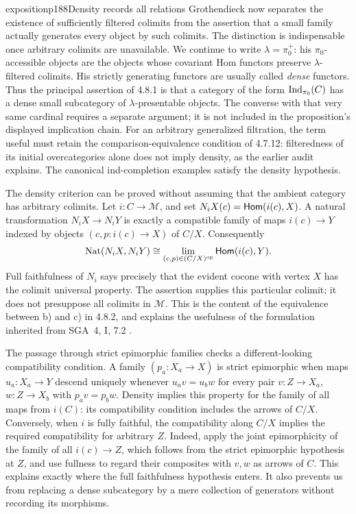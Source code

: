 
\begin{dcomment}{exposition}{p188}{Density records all relations}
Grothendieck now separates the existence of sufficiently filtered colimits from the assertion that a small family actually generates every object by such colimits. The distinction is indispensable once arbitrary colimits are unavailable. We continue to write $\lambda=\pi_0^+$: his $\pi_0$-accessible objects are the objects whose covariant Hom functors preserve $\lambda$-filtered colimits. His strictly generating functors are usually called \emph{dense} functors. Thus the principal assertion of 4.8.1 is that a category of the form $\operatorname{Ind}_{\pi_0}(C)$ has a dense small subcategory of $\lambda$-presentable objects. The converse with that very same cardinal requires a separate argument; it is not included in the proposition's displayed implication chain. For an arbitrary generalized filtration, the term useful must retain the comparison-equivalence condition of 4.7.12: filteredness of its initial overcategories alone does not imply density, as the earlier audit explains. The canonical ind-completion examples satisfy the density hypothesis.

The density criterion can be proved without assuming that the ambient category has arbitrary colimits. Let $i:C\to\mathcal M$, and set $N_iX(c)=\mathsf{Hom}(i(c),X)$. A natural transformation $N_iX\to N_iY$ is exactly a compatible family of maps $i(c)\to Y$ indexed by objects $(c,p:i(c)\to X)$ of $C/X$. Consequently
\[
 \operatorname{Nat}(N_iX,N_iY)
 \cong \lim_{(c,p)\in(C/X)^{\mathrm{op}}}\mathsf{Hom}(i(c),Y).
\]
Full faithfulness of $N_i$ says precisely that the evident cocone with vertex $X$ has the colimit universal property. The assertion supplies this particular colimit; it does not presuppose all colimits in $\mathcal M$. This is the content of the equivalence between b) and c) in 4.8.2, and explains the usefulness of the formulation inherited from SGA~4, I, 7.2 \citep{SGA4I1972}.

The passage through strict epimorphic families checks a different-looking compatibility condition. A family $(p_a:X_a\to X)$ is strict epimorphic when maps $u_a:X_a\to Y$ descend uniquely whenever $u_av=u_bw$ for every pair $v:Z\to X_a$, $w:Z\to X_b$ with $p_av=p_bw$. Density implies this property for the family of all maps from $i(C)$: its compatibility condition includes the arrows of $C/X$. Conversely, when $i$ is fully faithful, the compatibility along $C/X$ implies the required compatibility for arbitrary $Z$. Indeed, apply the joint epimorphicity of the family of all $i(c)\to Z$, which follows from the strict epimorphic hypothesis at $Z$, and use fullness to regard their composites with $v,w$ as arrows of $C$. This explains exactly where the full faithfulness hypothesis enters. It also prevents us from replacing a dense subcategory by a mere collection of generators without recording its morphisms.
\end{dcomment}


